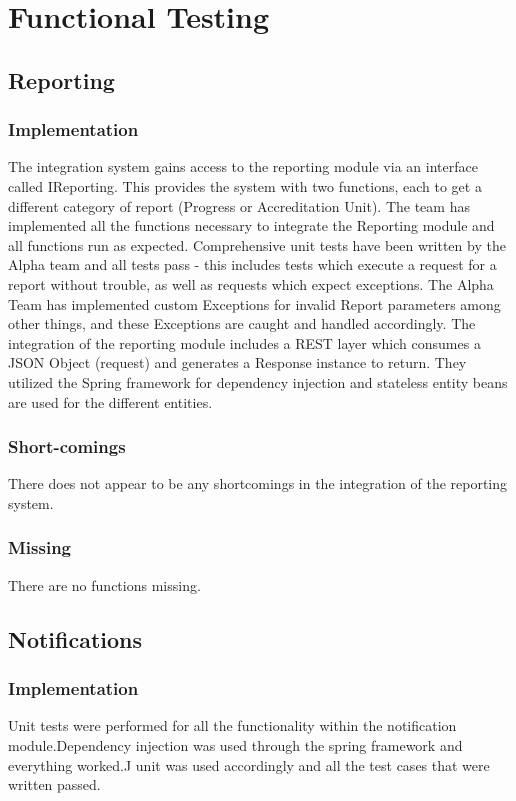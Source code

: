 \documentclass{article}
\begin{document}
\section{Functional Testing}
    \subsection{Reporting}
        \subsubsection{Implementation}
        The integration system gains access to the reporting module via an interface called IReporting. This provides the system with two functions, each to get a different category of report (Progress or Accreditation Unit). The team has implemented all the functions necessary to integrate the Reporting module and all functions run as expected. Comprehensive unit tests have been written by the Alpha team and all tests pass - this includes tests which execute a request for a report without trouble, as well as requests which expect exceptions. The Alpha Team has implemented custom Exceptions for invalid Report parameters among other things, and these Exceptions are caught and handled accordingly. The integration of the reporting module includes a REST layer which consumes a JSON Object (request) and generates a Response instance to return. They utilized the Spring framework for dependency injection and stateless entity beans are used for the different entities.
        \subsubsection{Short-comings}
        There does not appear to be any shortcomings in the integration of the reporting system.
        \subsubsection{Missing}
        There are no functions missing.
        
    \subsection{Notifications}
        \subsubsection{Implementation}
        Unit tests were performed for all the functionality within the notification module.Dependency injection was used through the spring framework and everything worked.J unit was used accordingly and all the test cases that were written passed.
\end{document}
